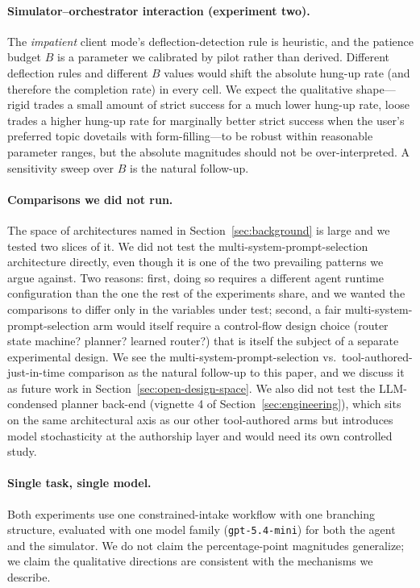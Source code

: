 \documentclass[11pt,a4paper]{article}
\begin{document}
\paragraph{Simulator--orchestrator interaction (experiment two).}
The \emph{impatient} client mode's deflection-detection rule is heuristic, and the patience budget $B$ is a parameter we calibrated by pilot rather than derived. Different deflection rules and different $B$ values would shift the absolute hung-up rate (and therefore the completion rate) in every cell. We expect the qualitative shape---rigid trades a small amount of strict success for a much lower hung-up rate, loose trades a higher hung-up rate for marginally better strict success when the user's preferred topic dovetails with form-filling---to be robust within reasonable parameter ranges, but the absolute magnitudes should not be over-interpreted. A sensitivity sweep over $B$ is the natural follow-up.

\paragraph{Comparisons we did not run.}
The space of architectures named in Section~\ref{sec:background} is large and we tested two slices of it. We did not test the multi-system-prompt-selection architecture directly, even though it is one of the two prevailing patterns we argue against. Two reasons: first, doing so requires a different agent runtime configuration than the one the rest of the experiments share, and we wanted the comparisons to differ only in the variables under test; second, a fair multi-system-prompt-selection arm would itself require a control-flow design choice (router state machine? planner? learned router?) that is itself the subject of a separate experimental design. We see the multi-system-prompt-selection vs.\ tool-authored-just-in-time comparison as the natural follow-up to this paper, and we discuss it as future work in Section~\ref{sec:open-design-space}. We also did not test the LLM-condensed planner back-end (vignette 4 of Section~\ref{sec:engineering}), which sits on the same architectural axis as our other tool-authored arms but introduces model stochasticity at the authorship layer and would need its own controlled study.

\paragraph{Single task, single model.}
Both experiments use one constrained-intake workflow with one branching structure, evaluated with one model family (\texttt{gpt-5.4-mini}) for both the agent and the simulator. We do not claim the percentage-point magnitudes generalize; we claim the qualitative directions are consistent with the mechanisms we describe.
\end{document}
